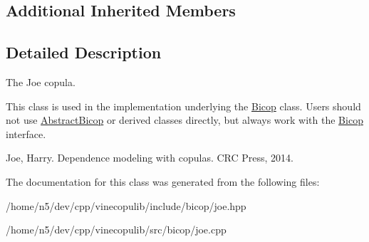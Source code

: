 \subsection*{Additional Inherited Members}


\subsection{Detailed Description}
The Joe copula. 

This class is used in the implementation underlying the \hyperlink{classvinecopulib_1_1_bicop}{Bicop} class. Users should not use \hyperlink{classvinecopulib_1_1_abstract_bicop}{Abstract\+Bicop} or derived classes directly, but always work with the \hyperlink{classvinecopulib_1_1_bicop}{Bicop} interface.

Joe, Harry. Dependence modeling with copulas. C\+RC Press, 2014. 

The documentation for this class was generated from the following files\+:\begin{DoxyCompactItemize}
\item 
/home/n5/dev/cpp/vinecopulib/include/bicop/joe.\+hpp\item 
/home/n5/dev/cpp/vinecopulib/src/bicop/joe.\+cpp\end{DoxyCompactItemize}
